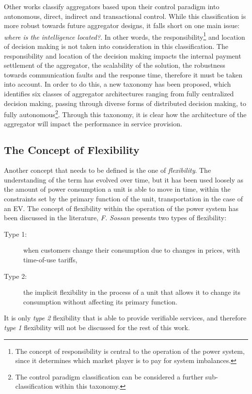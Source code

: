 Other works classify aggregators based upon their control paradigm into autonomous, direct, indirect and transactional control. While this classification is more robust towards future aggregator designs, it falls short on one main issue: \emph{where is the intelligence located?}. In other words, the responsibility\footnote{The concept of responsibility is central to the operation of the power system, since it determines which market player is to pay for system imbalances.} and location of decision making is not taken into consideration in this classification. The responsibility and location of the decision making impacts the internal payment settlement of the aggregator, the scalability of the solution, the robustness towards communication faults and the response time, therefore it must be taken into account. In order to do this, a new taxonomy has been proposed, which identifies six classes of aggregator architectures ranging from fully centralized decision making, passing through diverse forms of distributed decision making, to fully autonomous\footnote{The control paradigm classification can be considered a further sub-classification within this taxonomy.}. Through this taxonomy, it is clear how the architecture of the aggregator will impact the performance in service provision.

\subsection{The Concept of Flexibility} %
\label{sub:Flexibility}
Another concept that needs to be defined is the one of \emph{flexibility}. The understanding of the term has evolved over time, but it has been used loosely as the amount of power consumption a unit is able to move in time, within the constraints set by the primary function of the unit, \eg transportation in the case of an EV. The concept of flexibility within the operation of the power system has been discussed in the literature, \eg \emph{F. Sossan} presents two types of flexibility: 
\begin{description}
	\item[Type 1:] when customers change their consumption due to changes in prices, \eg with time-of-use tariffs,
	\item[Type 2:] the implicit flexibility in the process of a unit that allows it to change its consumption without affecting its primary function.
\end{description}
It is only \emph{type 2} flexibility that is able to provide verifiable services, and therefore \emph{type 1} flexibility will not be discussed for the rest of this work.

